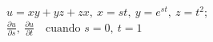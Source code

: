 \item $u = xy + yz + zx, \ x = st, \ y = e^{st}, \ z = t^2$; \\
$\frac{\partial u}{\partial s}, \ \frac{\partial u}{\partial t} \quad \text{cuando } s = 0, \ t = 1$

